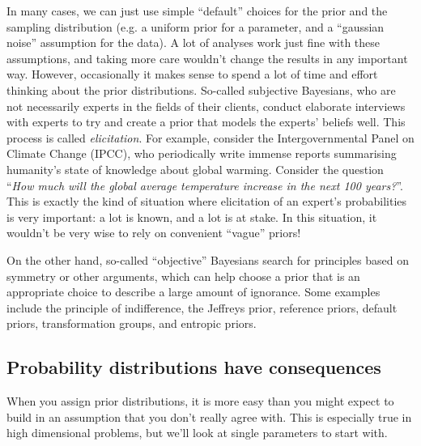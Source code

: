 In many cases, we can just use simple ``default'' choices for the prior and
the sampling distribution (e.g. a uniform prior for a parameter, and a
``gaussian noise'' assumption for the data). A lot of analyses work just fine
with these assumptions, and taking more care wouldn't change the results in
any important way. However, occasionally it makes sense to spend a lot of
time and effort thinking about the prior distributions.
So-called subjective Bayesians, who are not
necessarily experts in the fields of their clients, conduct elaborate interviews
with experts to try and create a prior that models the experts' beliefs well.
This process is called {\it elicitation}.
For example, consider the Intergovernmental Panel on Climate Change (IPCC),
who periodically write immense reports summarising humanity's state of knowledge
about global warming.
Consider the question ``{\it How much will the global average temperature
increase in the next 100 years?}''. This is exactly the kind of situation where
elicitation of an expert's probabilities is very important: a lot is known,
and a lot is at stake. In this situation, it wouldn't be very wise to rely on
convenient ``vague'' priors!

On the other hand, so-called ``objective'' Bayesians search for principles
based on symmetry or other arguments, which can help choose a prior that is
an appropriate choice to describe a large amount of ignorance. Some examples
include the principle of indifference, the Jeffreys prior, reference priors,
default priors, transformation groups, and entropic priors.

\subsection{Probability distributions have consequences}
When you assign prior distributions, it is more easy than you might expect to
build in an assumption that you don't really agree with. This is especially
true in high dimensional problems, but we'll look at single parameters to start
with.

